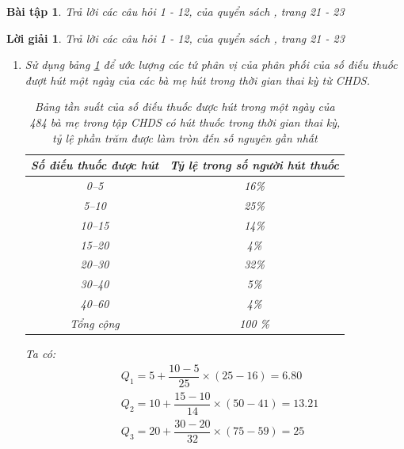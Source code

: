 \documentclass[14pt, a4paper]{article}
\theoremstyle{sltheorem}
\newtheorem{baitap}{Bài tập}
\theoremstyle{soltheorem}
\newtheorem*{loigiai}{Lời giải}
\begin{document}
\begin{baitap}
    Trả lời các câu hỏi 1 - 12, của quyển sách \cite{nolan2001stat}, trang 21 - 23
\end{baitap}

\begin{loigiai}
    Trả lời các câu hỏi 1 - 12, của quyển sách \cite{nolan2001stat}, trang 21 - 23
    \begin{enumerate}[wide, labelwidth=!, labelindent=0pt,label=\textbf{\arabic*}.]
        \item Sử dụng bảng \ref{tb:1.3} để ước lượng các tứ phân vị của phân phối của số điếu thuốc đượt hút một ngày của các bà mẹ hút trong thời gian thai kỳ từ CHDS.

            \begin{table}[h!]
                \begin{center}
                    \begin{tabular}{|c|c|}
                        \hline
                        \textbf{Số điếu thuốc được hút} & \textbf{Tỷ lệ trong số người hút thuốc} \\  
                        \hline
                        0--5 & 16\% \\  
                        5--10 & 25\% \\  
                        10--15 & 14\% \\  
                        15--20 & 4\% \\  
                        20--30 & 32\% \\  
                        30--40 & 5\% \\  
                        40--60 & 4\% \\  
                        \hline
                        Tổng cộng & 100 \% \\
                        \hline
                    \end{tabular}
                \end{center}
                \caption{Bảng tần suất của số điếu thuốc được hút trong một ngày của 484 bà mẹ trong tập CHDS có hút thuốc trong thời gian thai kỳ,
                tỷ lệ phần trăm được làm tròn đến số nguyên gần nhất}
                \label{tb:1.3}
            \end{table}
        
        Ta có:
        \begin{equation*}
            \begin{aligned}
                &Q_1 = 5 + \dfrac{10 - 5}{25} \times (25 - 16) = 6.80 \\
                &Q_2 = 10 + \dfrac{15 - 10}{14} \times (50 - 41) = 13.21 \\
                &Q_3 = 20 + \dfrac{30 - 20}{32} \times (75 - 59) = 25
            \end{aligned}
        \end{equation*}


\end{enumerate}
\end{loigiai}
\end{document}
